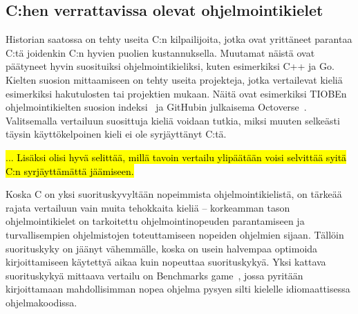 % 

\subsection{C:hen verrattavissa olevat ohjelmointikielet}

Historian saatossa on tehty useita C:n kilpailijoita, jotka ovat yrittäneet
parantaa C:tä joidenkin C:n hyvien puolien kustannuksella. Muutamat näistä ovat
päätyneet hyvin suosituiksi ohjelmointikieliksi, kuten esimerkiksi C++ ja Go.
Kielten suosion mittaamiseen on tehty useita projekteja, jotka vertailevat
kieliä esimerkiksi hakutulosten tai projektien mukaan. Näitä ovat esimerkiksi
TIOBEn ohjelmointikielten suosion indeksi~\citep{tiobe} ja GitHubin julkaisema
Octoverse~\citep{octoverse}. Valitsemalla vertailuun suosittuja kieliä voidaan
tutkia, miksi muuten selkeästi täysin käyttökelpoinen kieli ei ole syrjäyttänyt
C:tä.

\hl{... Lisäksi olisi hyvä selittää, millä tavoin vertailu ylipäätään voisi
selvittää syitä C:n syrjäyttämättä jäämiseen.}

Koska C on yksi suorituskyvyltään nopeimmista ohjelmointikielistä, on
tärkeää rajata vertailuun vain muita tehokkaita kieliä -- korkeamman tason
ohjelmointikielet on tarkoitettu ohjelmointinopeuden parantamiseen ja
turvallisempien ohjelmistojen toteuttamiseen nopeiden ohjelmien sijaan. Tällöin
suorituskyky on jäänyt vähemmälle, koska on usein halvempaa optimoida
kirjoittamiseen käytettyä aikaa kuin nopeuttaa suorituskykyä\citationneeded.
Yksi kattava suorituskykyä mittaava vertailu on Benchmarks
game~\citep{benchmarks}, jossa pyritään kirjoittamaan mahdollisimman nopea
ohjelma pysyen silti kielelle idiomaattisessa ohjelmakoodissa.

